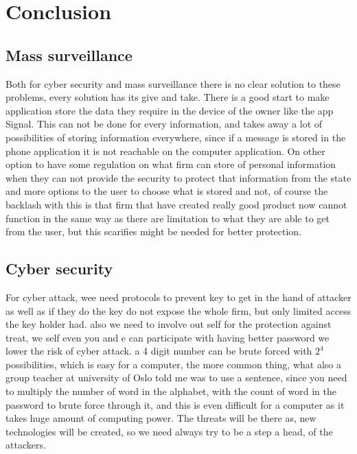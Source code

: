 \documentclass{article}
\begin{document}
\newpage
\section{Conclusion}
\subsection{Mass surveillance}
Both for cyber security and mass surveillance there is no clear solution to these problems, every solution has its give and take. There is a good start to make application store the data they require in the device of the owner like the app Signal. This can not be done for every information, and takes away a lot of possibilities of storing information everywhere, since if a message is stored in the phone application it is not reachable on the computer application. On other option to have some regulation on what firm can store of personal information when they can not provide the security to protect that information from the state and more options to the user to choose what is stored and not, of course the backlash with this is that firm that have created really good product now cannot function in the same way as there are limitation to what they are able to get from the user, but this scarifies might be needed for better protection.

\subsection{Cyber security}
For cyber attack, wee need protocols to prevent key to get in the hand of attacker as well as if they do the key do not expose the whole firm, but only limited access the key holder had. also we need to involve out self for the protection against treat, we self even you and e can participate with having better password we lower the risk of cyber attack. a 4 digit number can be brute forced with $2^4$ possibilities, which is easy for a computer, the more common thing, what also a group teacher at university of Oslo told me was to use a sentence, since you need to multiply the number of word in the alphabet, with the count of word in the password to brute force through it, and this is even difficult for a computer as it takes huge amount of computing power. The threats will be there as, new technologies will be created, so we need always try to be a step a head, of the attackers.

\newpage
\end{document}
